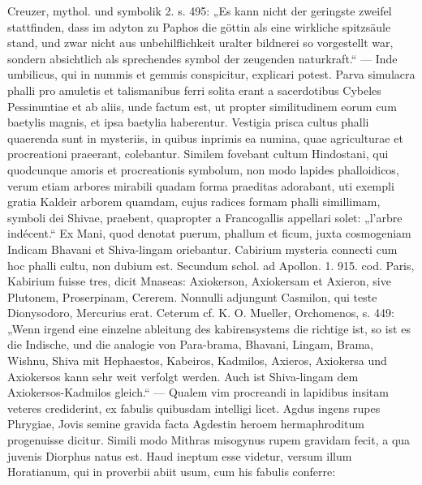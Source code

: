 \documentclass[a4paper, 11pt, oneside, polutonikogreek, german]{article}
\begin{document}
Creuzer, mythol. und symbolik 2. s. 495: „Es kann nicht der geringste zweifel stattfinden, dass im adyton zu Paphos die göttin als eine wirkliche spitzsäule stand, und zwar nicht aus unbehilflichkeit uralter bildnerei so vorgestellt war, sondern absichtlich als sprechendes symbol der zeugenden naturkraft.“ --- Inde umbilicus, qui in nummis et gemmis conspicitur, explicari potest. Parva simulacra phalli pro amuletis et talismanibus ferri solita erant a sacerdotibus Cybeles Pessinuntiae et ab aliis, unde factum est, ut propter similitudinem eorum cum baetylis magnis, et ipsa baetylia haberentur. Vestigia prisca cultus phalli quaerenda sunt in mysteriis, in quibus inprimis ea numina, quae agriculturae et procreationi praeerant, colebantur. Similem fovebant cultum Hindostani, qui quodcunque amoris et procreationis symbolum, non modo lapides phalloidicos, verum etiam arbores mirabili quadam forma praeditas adorabant, uti exempli gratia Kaldeir arborem quamdam, cujus radices formam phalli simillimam, symboli dei Shivae, praebent, quapropter a Francogallis appellari solet: „l'arbre indécent.“ Ex Mani, quod denotat puerum, phallum et ficum, juxta cosmogeniam Indicam Bhavani et Shiva-lingam oriebantur. Cabirium mysteria connecti cum hoc phalli cultu, non dubium est. Secundum schol. ad Apollon. 1. 915. cod. Paris, Kabirium fuisse tres, dicit Mnaseas: Axiokerson, Axiokersam et Axieron, sive Plutonem, Proserpinam, Cererem. Nonnulli adjungunt Casmilon, qui teste Dionysodoro, Mercurius erat. Ceterum cf. K. O. Mueller, Orchomenos, s. 449: „Wenn irgend eine einzelne ableitung des kabirensystems die richtige ist, so ist es die Indische, und die analogie von Para-brama, Bhavani, Lingam, Brama, Wishnu, Shiva mit Hephaestos, Kabeiros, Kadmilos, Axieros, Axiokersa und Axiokersos kann sehr weit verfolgt werden. Auch ist Shiva-lingam dem Axiokersos-Kadmilos gleich.“ --- Qualem vim procreandi in lapidibus insitam veteres crediderint, ex fabulis quibusdam intelligi licet. Agdus ingens rupes Phrygiae, Jovis semine gravida facta Agdestin heroem hermaphroditum progenuisse dicitur. Simili modo Mithras misogynus rupem gravidam fecit, a qua juvenis Diorphus natus est. Haud ineptum esse videtur, versum illum Horatianum, qui in proverbii abiit usum, cum his fabulis conferre:
\end{document}
